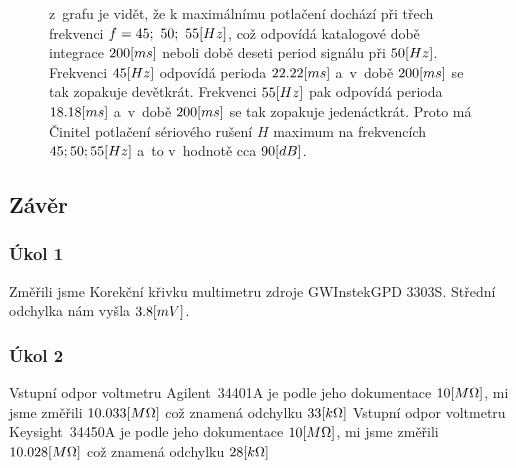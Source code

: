 \documentclass{article}
\begin{document}
\begin{figure}[H]
\begin{minipage}[t]{0.7\textwidth}
    \end{minipage}
    \hfill
    \begin{minipage}[t]{0.2\textwidth}
        \vspace{-108mm}
        z~grafu je vidět, že k maximálnímu potlačení dochází při třech frekvenci \(f = 45;~50;~55\-[Hz]\), což odpovídá katalogové době integrace \(200\-[ms]\) neboli době deseti period signálu při \(50\-[Hz]\).
        Frekvenci \(45\-[Hz]\) odpovídá perioda \(22.22\-[ms]\) a~v~době \(200\-[ms]\) se tak zopakuje devětkrát.
        Frekvenci \(55\-[Hz]\) pak odpovídá perioda \(18.18\-[ms]\) a~v~době \(200\-[ms]\) se tak zopakuje jedenáctkrát.
        Proto má Činitel potlačení sériového rušení \(H\) maximum na frekvencích \\\(45;\-50;\-55\-[Hz]\) a~to v~hodnotě cca \(90\-[dB]\).
    \end{minipage}
\end{figure}

\newpage
\subsection*{Závěr}

\subsubsection*{Úkol 1}
Změřili jsme Korekční křivku multimetru zdroje GWInstekGPD 3303S.
Střední odchylka nám vyšla \(3.8\-[mV]\).

\subsubsection*{Úkol 2}
Vstupní odpor voltmetru Agilent~34401A  je podle jeho dokumentace \(10\-[M\Omega]\), mi jsme změřili \(10.033\-[M\Omega]\) což znamená odchylku \(33\-[k\Omega]\)
Vstupní odpor voltmetru Keysight~34450A je podle jeho dokumentace \(10\-[M\Omega]\), mi jsme změřili \(10.028\-[M\Omega]\) což znamená odchylku \(28\-[k\Omega]\)
\end{document}
